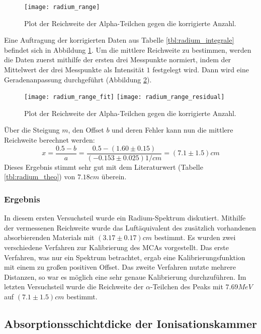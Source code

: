 \documentclass{../Misc/MontavonLaTeX/Montavon}
\newcommand{\halfwidth}{0.48\textwidth}
\newcommand{\fullwidth}{1.0\textwidth}
\begin{document}
\begin{figure}[htbp]
\centering
\texttt{[image: radium\_range]}
\caption{Plot der Reichweite der Alpha-Teilchen gegen die korrigierte Anzahl.}
\label{fig:radium_range}
\end{figure}

Eine Auftragung der korrigierten Daten aus Tabelle \ref{tbl:radium_integrale} befindet sich in Abbildung \ref{fig:radium_range}. Um die mittlere Reichweite zu bestimmen, werden die Daten zuerst mithilfe der ersten drei Messpunkte normiert, indem der Mittelwert der drei Messpunkte als Intensität $1$ festgelegt wird. Dann wird eine Geradenanpassung durchgeführt (Abbildung \ref{fig:radium_range_fit}).

\begin{figure}[htbp]
\centering
\texttt{[image: radium\_range\_fit]}
\texttt{[image: radium\_range\_residual]}
\caption{Plot der Reichweite der Alpha-Teilchen gegen die korrigierte Anzahl.}
\label{fig:radium_range_fit}
\end{figure}

Über die Steigung $m$, den Offset $b$ und deren Fehler kann nun die mittlere Reichweite berechnet werden:
\[
	x = \frac{0.5-b}{a} = \frac{0.5 - (1.60 \pm 0.15)}{(-0.153 \pm 0.025) \unit{1/cm}} = (7.1 \pm 1.5) \unit{cm}
\]
Dieses Ergebnis stimmt sehr gut mit dem Literaturwert (Tabelle \ref{tbl:radium_theo}) von $7.18 \unit{cm}$ überein.

\subsubsection{Ergebnis}

In diesem ersten Versuchsteil wurde ein Radium-Spektrum diskutiert. Mithilfe der vermessenen Reichweite wurde das Luftäquivalent des zusätzlich vorhandenen absorbierenden Materials mit $(3.17 \pm 0.17) \unit{cm}$ bestimmt. Es wurden zwei verschiedene Verfahren zur Kalibrierung des MCAs vorgestellt. Das erste Verfahren, was nur ein Spektrum betrachtet, ergab eine Kalibrierungsfunktion mit einem zu großen positiven Offset. Das zweite Verfahren nutzte mehrere Distanzen, so war es möglich eine sehr genaue Kalibrierung durchzuführen. Im letzten Versuchsteil wurde die Reichweite der $\alpha$-Teilchen des  Peaks mit $7.69 \unit{MeV}$ auf $(7.1 \pm 1.5) \unit{cm}$ bestimmt.

\subsection{Absorptionsschichtdicke der Ionisationskammer}
\end{document}
